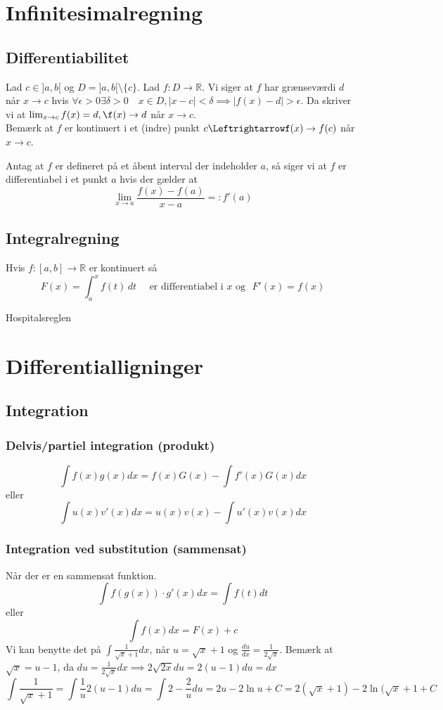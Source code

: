 \chapter{Infinitesimalregning}
\section{Differentiabilitet}
\begin{definition}Lad $c\in]a,b[$ og $D=]a,b[\setminus\{c\}$. Lad $f:D\to\mathbb{R}$. Vi siger at $f$ har grænseværdi $d$ når $x\to c$ hvis $\forall\epsilon>0\exists\delta>0\quad x\in D,|x-c|<\delta\implies|f(x)-d|>\epsilon$. Da skriver vi at $\lim_{x\to c}f(x)=d,\f(x)\to d$ når $x\to c$.\\Bemærk at $f$ er kontinuert i et (indre) punkt $c\Leftrightarrowf(x)\to f(c)$ når $x\to c$.\end{definition}

\begin{definition}
Antag at $f$ er defineret på et åbent interval der indeholder $a$, så siger vi at $f$ er differentiabel i et punkt $a$ hvis der gælder at$$\lim_{x\to a}\frac{f(x)-f(a)}{x-a}=:f'(a)$$
\end{definition}
\section{Integralregning}
Hvis $f:[a,b]\to\mathbb{R}$ er kontinuert så$$F(x)=\int_a^xf(t)\,dt\quad\text{ er differentiabel i }x\text{ og }\,\,F'(x)=f(x)$$

Hospitalsreglen

\chapter{Differentialligninger}
\section{Integration}
\subsection{Delvis/partiel integration (produkt)}
$$\int f(x)g(x)dx=f(x)G(x)-\int f'(x)G(x)dx$$eller$$\int u(x)v'(x)dx=u(x)v(x)-\int u'(x)v(x)dx$$
\subsection{Integration ved substitution (sammensat)}

Når der er en sammensat funktion.$$\int f(g(x))\cdot g'(x)dx=\int f(t)dt$$eller$$\int f(x)dx=F(x)+c$$
Vi kan benytte det på $\int \frac{1}{\sqrt{x}+1} dx$, når $u=\sqrt{x}+1$ og $\frac{du}{dx}=\frac{1}{2\sqrt{x}}$. Bemærk at $\sqrt{x}=u-1$, da $du=\frac{1}{2\sqrt{x}}dx\implies 2\sqrt{2x}du=2(u-1)du=dx$
$$\int \frac{1}{\sqrt{x}+1}=\int\frac{1}{u}2(u-1)du=\int2-\frac{2}{u}du=2u-2\ln{u}+C=2(\sqrt{x}+1)-2\ln{(\sqrt{x}+1}+C$$

